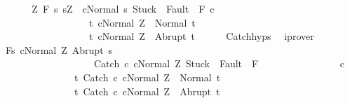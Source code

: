 \begin{isabellebody}
\ \ \isamarkupfalse%
\isanewline
\ \ \isamarkupfalse%
\ {\isachardoublequoteopen}{\isasymforall}Z{\isachardot}\ {\isasymGamma}{\isacharcomma}{\isasymTheta}{\isasymturnstile}\isactrlbsub {\isacharslash}F\isactrlesub \ {\isacharbraceleft}s{\isachardot}\ s{\isacharequal}Z\ {\isasymand}\ {\isasymGamma}{\isasymturnstile}{\isasymlangle}cNormal\ s{\isasymrangle}\ {\isasymRightarrow}{\isasymnotin}{\isacharparenleft}{\isacharbraceleft}Stuck{\isacharbraceright}\ {\isasymunion}\ Fault\ {\isacharbackquote}\ {\isacharparenleft}{\isacharminus}F{\isacharparenright}{\isacharparenright}{\isacharbraceright}\ c\isanewline
\ \ \ \ \ \ \ \ \ \ \ \ \ \ \ \ \ \ {\isacharbraceleft}t{\isachardot}\ {\isasymGamma}{\isasymturnstile}{\isasymlangle}cNormal\ Z{\isasymrangle}\ {\isasymRightarrow}\ Normal\ t{\isacharbraceright}{\isacharcomma}\isanewline
\ \ \ \ \ \ \ \ \ \ \ \ \ \ \ \ \ \ {\isacharbraceleft}t{\isachardot}\ {\isasymGamma}{\isasymturnstile}{\isasymlangle}cNormal\ Z{\isasymrangle}\ {\isasymRightarrow}\ Abrupt\ t{\isacharbraceright}{\isachardoublequoteclose}\isanewline
\ \ \ \ \isamarkupfalse%
\ Catch{\isachardot}hyps\ \isamarkupfalse%
\ iprover\isanewline
\ \ \isamarkupfalse%
\ {\isachardoublequoteopen}{\isasymGamma}{\isacharcomma}{\isasymTheta}{\isasymturnstile}\isactrlbsub {\isacharslash}F\isactrlesub {\isacharbraceleft}s{\isachardot}\ {\isasymGamma}{\isasymturnstile}{\isasymlangle}cNormal\ Z{\isasymrangle}\ {\isasymRightarrow}Abrupt\ s\ {\isasymand}\ \isanewline
\ \ \ \ \ \ \ \ \ \ \ \ \ \ \ \ \ \ \ {\isasymGamma}{\isasymturnstile}{\isasymlangle}Catch\ c\ cNormal\ Z{\isasymrangle}\ {\isasymRightarrow}{\isasymnotin}{\isacharparenleft}{\isacharbraceleft}Stuck{\isacharbraceright}\ {\isasymunion}\ Fault\ {\isacharbackquote}\ {\isacharparenleft}{\isacharminus}F{\isacharparenright}{\isacharparenright}{\isacharbraceright}\ \isanewline
\ \ \ \ \ \ \ \ \ \ \ \ \ \ \ c\isanewline
\ \ \ \ \ \ \ \ \ \ \ \ \ \ \ {\isacharbraceleft}t{\isachardot}\ {\isasymGamma}{\isasymturnstile}{\isasymlangle}Catch\ c\ cNormal\ Z{\isasymrangle}\ {\isasymRightarrow}\ Normal\ t{\isacharbraceright}{\isacharcomma}\isanewline
\ \ \ \ \ \ \ \ \ \ \ \ \ \ \ {\isacharbraceleft}t{\isachardot}\ {\isasymGamma}{\isasymturnstile}{\isasymlangle}Catch\ c\ cNormal\ Z{\isasymrangle}\ {\isasymRightarrow}\ Abrupt\ t{\isacharbraceright}{\isachardoublequoteclose}\isanewline

\end{isabellebody}

